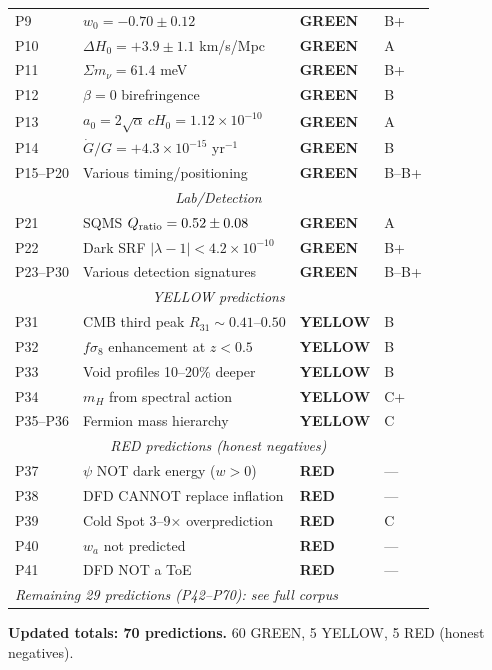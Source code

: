 \documentclass[11pt,a4paper]{article}
\newcommand{\GREEN}{\textcolor{dfdgreen}{\textbf{GREEN}}}
\newcommand{\YELLOW}{\textcolor{dfdyellow}{\textbf{YELLOW}}}
\newcommand{\RED}{\textcolor{dfdred}{\textbf{RED}}}
\begin{document}
\begin{longtable}{llll}
P9 & $w_0 = -0.70 \pm 0.12$ & \GREEN{} & B+ \\
P10 & $\Delta H_0 = +3.9 \pm 1.1$ km/s/Mpc & \GREEN{} & A \\
P11 & $\Sigma m_\nu = 61.4$ meV & \GREEN{} & B+ \\
P12 & $\beta = 0$ birefringence & \GREEN{} & B \\
P13 & $a_0 = 2\sqrt{\alpha}\,cH_0 = 1.12 \times 10^{-10}$ & \GREEN{} & A \\
P14 & $\dot{G}/G = +4.3 \times 10^{-15}$ yr$^{-1}$ & \GREEN{} & B \\
P15--P20 & Various timing/positioning & \GREEN{} & B--B+ \\
\midrule
\multicolumn{4}{c}{\textit{Lab/Detection}} \\
\midrule
P21 & SQMS $Q_{\rm ratio} = 0.52 \pm 0.08$ & \GREEN{} & A \\
P22 & Dark SRF $|\lambda-1| < 4.2 \times 10^{-10}$ & \GREEN{} & B+ \\
P23--P30 & Various detection signatures & \GREEN{} & B--B+ \\
\midrule
\multicolumn{4}{c}{\textit{YELLOW predictions}} \\
\midrule
P31 & CMB third peak $R_{31} \sim 0.41$--$0.50$ & \YELLOW{} & B \\
P32 & $f\sigma_8$ enhancement at $z < 0.5$ & \YELLOW{} & B \\
P33 & Void profiles 10--20\% deeper & \YELLOW{} & B \\
P34 & $m_H$ from spectral action & \YELLOW{} & C+ \\
P35--P36 & Fermion mass hierarchy & \YELLOW{} & C \\
\midrule
\multicolumn{4}{c}{\textit{RED predictions (honest negatives)}} \\
\midrule
P37 & $\psi$ NOT dark energy ($w > 0$) & \RED{} & --- \\
P38 & DFD CANNOT replace inflation & \RED{} & --- \\
P39 & Cold Spot 3--9$\times$ overprediction & \RED{} & C \\
P40 & $w_a$ not predicted & \RED{} & --- \\
P41 & DFD NOT a ToE & \RED{} & --- \\
\midrule
\multicolumn{4}{l}{\textit{Remaining 29 predictions (P42--P70): see full corpus}} \\
\bottomrule
\end{longtable}

\textbf{Updated totals: 70 predictions.} 60 GREEN, 5 YELLOW, 5 RED (honest negatives).
\end{document}
